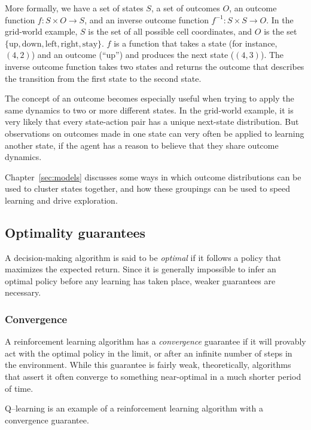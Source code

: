 More formally, we have a set of states $S$, a set of outcomes $O$, an outcome function $f:S \times O \rightarrow S$, and an inverse outcome function $f^{-1}: S \times S \rightarrow O$. In the grid-world example, $S$ is the set of all possible cell coordinates, and $O$ is the set $\{\mbox{up},\mbox{down},\mbox{left},\mbox{right},\mbox{stay}\}$. $f$ is a function that takes a state (for instance, $(4,2)$) and an outcome (``up'') and produces the next state ($(4,3)$). The inverse outcome function takes two states and returns the outcome that describes the transition from the first state to the second state.

The concept of an outcome becomes especially useful when trying to apply the same dynamics to two or more different states. In the grid-world example, it is very likely that every state-action pair has a unique next-state distribution. But observations on outcomes made in one state can very often be applied to learning another state, if the agent has a reason to believe that they share outcome dynamics.

Chapter~\ref{sec:models} discusses some ways in which outcome distributions can be used to cluster states together, and how these groupings can be used to speed learning and drive exploration.

\subsection{Optimality guarantees}

A decision-making algorithm is said to be \emph{optimal} if it follows a policy that maximizes the expected return. Since it is generally impossible to infer an optimal policy before any learning has taken place, weaker guarantees are necessary.

\subsubsection{Convergence}

A reinforcement learning algorithm has a \emph{convergence} guarantee if it will provably act with the optimal policy in the limit, or after an infinite number of steps in the environment. While this guarantee is fairly weak, theoretically, algorithms that assert it often converge to something near-optimal in a much shorter period of time.

Q--learning\cite{Watkins92} is an example of a reinforcement learning algorithm with a convergence guarantee.

